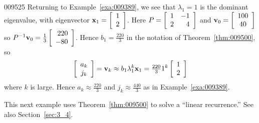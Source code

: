 \begin{example}{}{009525}
Returning to Example~\ref{exa:009389}, we see that $\lambda_{1} = 1$ is the dominant eigenvalue, with eigenvector $\textbf{x}_1 = \left[ \begin{array}{c}
1 \\
2
\end{array} \right]$.
 Here $P = \left[ \begin{array}{rr}
1 & -1 \\
2 & 4 
\end{array} \right]$ 
 and $\textbf{v}_0 = \left[ \begin{array}{c}
100 \\
40
\end{array} \right]$
 so $P^{-1} \textbf{v}_0 = \tfrac{1}{3} \left[ \begin{array}{r}
220 \\
-80
\end{array}\right]$.
 Hence $b_1 = \frac{220}{3}$
 in the notation of Theorem~\ref{thm:009500}, so
\begin{equation*}
\left[ \begin{array}{c}
a_k \\
j_k 
\end{array}
\right] = \textbf{v}_k \approx b_1\lambda_1^k \textbf{x}_1  = \tfrac{220}{3} 1^k \left[ \begin{array}{r}
1 \\
2
\end{array} \right]
\end{equation*}
where $k$ is large. Hence $ a_k \approx \frac{220}{3}$ 
 and $j_k \approx \frac{440}{3}$
 as in Example~\ref{exa:009389}.
\end{example}

This next example uses Theorem~\ref{thm:009500} to solve a ``linear recurrence.'' See also Section~\ref{sec:3_4}.


